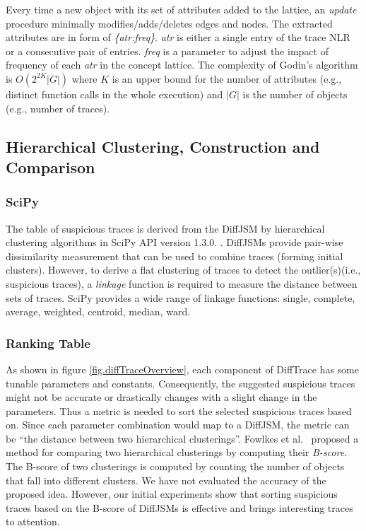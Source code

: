Every time a new object with its set of attributes added to the lattice,
an \textit{update} procedure minimally modifies/adds/deletes edges and nodes.
%
%
The extracted attributes are in form of \textit{\{atr:freq\}}. 
%
\textit{atr} is either a single entry of the trace NLR or a consecutive pair of entries.
\textit{freq} is a parameter to adjust the impact of frequency of each \textit{atr}
in the concept lattice.
%
The complexity of Godin's algorithm is $O(2^{2K}|G|)$ where $K$ is an upper bound for the number of attributes (e.g., distinct function calls in the whole execution) and $|G|$ is the number of objects (e.g., number of traces).




\subsection{Hierarchical Clustering, Construction and Comparison}
 \label{subsec:algo-bscore}
 
\subsubsection{SciPy}
The table of suspicious traces is derived from the DiffJSM by hierarchical clustering algorithms in SciPy API version 1.3.0. \cite{scipy}.
%
DiffJSMs provide pair-wise dissimilarity measurement that can be used to combine traces (forming initial clusters).
%
However, to derive a flat clustering of traces to detect the outlier(s)(i.e., suspicious traces), a \textit{linkage} function is required to measure the distance between sets of traces.
%
SciPy provides a wide range of linkage functions: single, complete, average, weighted, centroid, median, ward.

\subsubsection{Ranking Table}
As shown in figure \ref{fig.diffTraceOverview}, each component of DiffTrace has some tunable parameters and constants.
%
Consequently, the suggested suspicious traces might not be accurate or drastically changes with a slight change in the parameters.
%
Thus a metric is needed to sort the selected suspicious traces based on.
%
Since each parameter combination would map to a DiffJSM, the metric can be ``the distance between two hierarchical clusterings''.
%
Fowlkes et al.~\cite{fowlkes83} proposed a method for comparing two hierarchical clusterings by computing their \textit{B-score}.
%
The B-score of two clusterings is computed by counting the number of objects that fall into different clusters.
%
We have not evaluated the accuracy of the proposed idea.
%
However, our initial experiments show that sorting suspicious traces based on the B-score of DiffJSMs is effective and brings interesting traces to attention.

